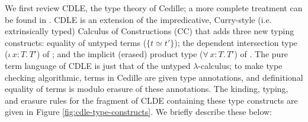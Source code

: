\documentclass{article}
\newcommand{\abs}[4]{{#1}\, #2\! : \! #3.\, #4}
\begin{document}
We first review CDLE, the type theory of Cedille; a more complete treatment can
be found in \cite{St18_Cedille-Syntax-Semantics}. CDLE is an extension of the
impredicative, Curry-style (i.e. extrinsically typed) Calculus of Constructions
(CC) that adds three new typing constructs: equality of untyped terms ($\{t ≃
t'\}$); the dependent intersection type ($\abs{ι}{x}{T}{T'}$) of
\cite{Ko03_Dependent-Intersection}; and the implicit (erased) product type
($\abs{∀}{x}{T}{T'}$) of \cite{Mi01_ICC}. The pure term language of CDLE is just
that of the untyped $\lambda$-calculus; to make type checking algorithmic,
terms in Cedille are given type annotations, and definitional equality of
terms is modulo erasure of these annotations. The kinding, typing, and erasure
rules for the fragment of CLDE containing these type constructs are given in
Figure \ref{fig:cdle-type-constructs}. We briefly describe these below:
\end{document}
